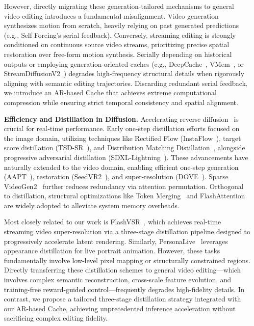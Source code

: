 \documentclass{llmxive}
\begin{document}
However, directly migrating these generation-tailored mechanisms to general video editing introduces a fundamental misalignment. Video generation synthesizes motion from scratch, heavily relying on past generated predictions (e.g., Self Forcing's serial feedback). Conversely, streaming editing is strongly conditioned on continuous source video streams, prioritizing precise spatial restoration over free-form motion synthesis. Serially depending on historical outputs or employing generation-oriented caches (e.g., DeepCache~\cite{ma2024deepcache}, VMem~\cite{li2025vmem}, or StreamDiffusionV2~\cite{feng2025streamdiffusionv2}) degrades high-frequency structural details when rigorously aligning with semantic editing trajectories. Discarding redundant serial feedback, we introduce an AR-based Cache that achieves extreme computational compression while ensuring strict temporal consistency and spatial alignment.

\noindent \textbf{Efficiency and Distillation in Diffusion.}
\label{subsec:distillation}
Accelerating reverse diffusion~\cite{song2023consistencymodels,wang2023videolcm,salimans2022progressive, zheng2025compute, liu2025survey, zheng2026forecast} is crucial for real-time performance. Early one-step distillation efforts focused on the image domain, utilizing techniques like Rectified Flow (InstaFlow~\cite{liu2023instaflow}), target score distillation (TSD-SR~\cite{Dong_2025_CVPR}), and Distribution Matching Distillation~\cite{yin2024improved,yin2025slow}, alongside progressive adversarial distillation (SDXL-Lightning~\cite{lin2024sdxl}). These advancements have naturally extended to the video domain, enabling efficient one-step generation (AAPT~\cite{lin2025diffusion}), restoration (SeedVR2~\cite{wang2025seedvr2}), and super-resolution (DOVE~\cite{chen2025doveefficientonestepdiffusion}). Sparse VideoGen2~\cite{yang2025sparsevideogen2acceleratevideo} further reduces redundancy via attention permutation. Orthogonal to distillation, structural optimizations like Token Merging~\cite{bolya2022token} and FlashAttention~\cite{dao2022flashattention} are widely adopted to alleviate system memory overheads.

Most closely related to our work is FlashVSR~\cite{zhuang2025flashvsr}, which achieves real-time streaming video super-resolution via a three-stage distillation pipeline designed to progressively accelerate latent rendering. Similarly, PersonaLive~\cite{li2025personalive} leverages appearance distillation for live portrait animation. However, these tasks fundamentally involve low-level pixel mapping or structurally constrained regions. Directly transferring these distillation schemes to general video editing—which involves complex semantic reconstruction, cross-scale feature evolution, and training-free reward-guided control—frequently degrades high-fidelity details. In contrast, we propose a tailored three-stage distillation strategy integrated with our AR-based Cache, achieving unprecedented inference acceleration without sacrificing complex editing fidelity.
\end{document}
